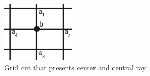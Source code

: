 \begin{figure}[htb]	
\center%
\includegraphics[width=3.5cm]{./img/centroRaioCentral.png}
\caption{Grid cut that presents center and central ray}
\label{fig:centroRaioCentral}
\end{figure}